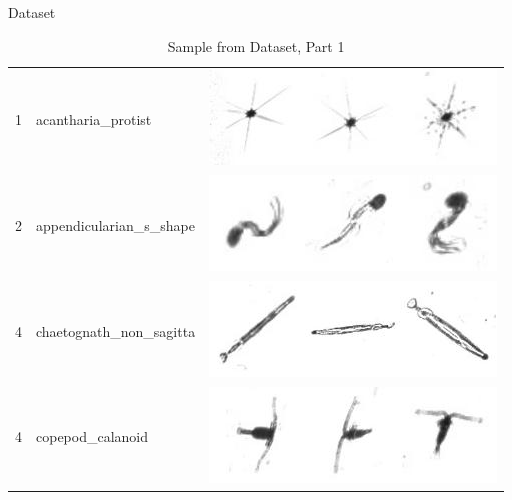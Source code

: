 \documentclass[mathserif]{beamer}
\begin{document}
\begin{frame}{Dataset}
\vspace{-1cm}
\begin{table}[ht!]
\centering
\caption{Sample from Dataset, Part 1}
\begin{tabular}{m{3pt} m{130pt} | m{120pt}}
\toprule
1 & acantharia\_protist & \includegraphics[scale=0.4]{./fig/acantharia_protist.png}\\
2 & appendicularian\_s\_shape & \includegraphics[scale=0.4]{./fig/appendicularian_s_shape.png}\\
4 & chaetognath\_non\_sagitta & \includegraphics[scale=0.4]{./fig/chaetognath_non_sagitta.png}\\
4 & copepod\_calanoid & \includegraphics[scale=0.4]{./fig/copepod_calanoid.png}\\
\bottomrule
\end{tabular}
\end{table}
\end{frame}
\end{document}
